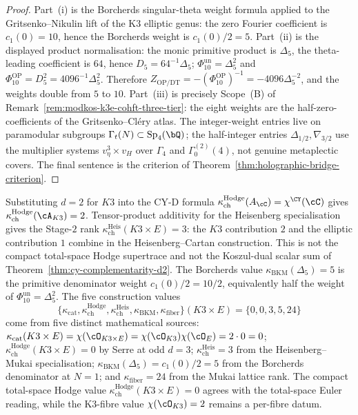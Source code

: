 \begin{proof}
Part~(i) is the Borcherds singular-theta weight formula applied to the
Gritsenko--Nikulin lift of the K3 elliptic genus: the zero Fourier
coefficient is \(c_1(0)=10\), hence the Borcherds weight is
\(c_1(0)/2=5\). Part~(ii) is the displayed product normalisation:
the monic primitive product is \(\Delta_5\), the theta-leading
coefficient is \(64\), hence \(D_5=64^{-1}\Delta_5\);
\(\Phi_{10}^{\mathrm{un}}=\Delta_5^2\) and
\(\Phi_{10}^{\mathrm{OP}}=D_5^2=4096^{-1}\Delta_5^2\). Therefore
\(Z_{\mathrm{OP}/\mathrm{DT}}=-(\Phi_{10}^{\mathrm{OP}})^{-1}
=-4096\Delta_5^{-2}\), and the weights double from \(5\) to \(10\).
Part~(iii) is precisely Scope~(B) of
Remark~\ref{rem:modkos-k3e-cohft-three-tier}: the eight weights are
the half-zero-coefficients of the Gritsenko--Cl\'ery atlas. The
integer-weight entries live on paramodular subgroups
$\Gamma_t(N) \subset \mathrm{Sp}_4(\bQ)$; the half-integer entries
$\Delta_{1/2}, \nabla_{3/2}$ use the multiplier systems
$v_\eta^3 \times v_H$ over $\Gamma_4$ and $\Gamma_0^{(2)}(4)$, not
genuine metaplectic covers.
The final sentence is the criterion of
Theorem~\ref{thm:holographic-bridge-criterion}.
\end{proof}

\begin{remark}
\label{rem:kappa-spectrum-k3xe-bridge}
Substituting $d = 2$ for $K3$ into the CY-D formula $\kappa_{\mathrm{ch}}^{\mathrm{Hodge}}(A_\cC) = \chi^{\CY}(\cC)$ gives $\kappa_{\mathrm{ch}}^{\mathrm{Hodge}}(\cA_{K3}) = 2$. Tensor-product additivity for the Heisenberg specialisation gives the Stage-$2$ rank $\kappa_{\mathrm{ch}}^{\mathrm{Heis}}(K3 \times E) = 3$: the $K3$ contribution $2$ and the elliptic contribution $1$ combine in the Heisenberg--Cartan construction. This is not the compact total-space Hodge supertrace and not the Koszul-dual scalar sum of Theorem~\ref{thm:cy-complementarity-d2}. The Borcherds value $\kappa_{\mathrm{BKM}}(\Delta_5) = 5$ is the primitive denominator weight $c_1(0)/2=10/2$, equivalently half the weight of $\Phi_{10}^{\mathrm{un}}=\Delta_5^2$. The five construction values
\[
\{\kappa_{\mathrm{cat}}, \kappa_{\mathrm{ch}}^{\mathrm{Hodge}},
\kappa_{\mathrm{ch}}^{\mathrm{Heis}},
\kappa_{\mathrm{BKM}}, \kappa_{\mathrm{fiber}}\}(K3\times E)
=\{0, 0, 3, 5, 24\}
\]
come from five distinct mathematical sources: $\kappa_{\mathrm{cat}}(K3 \times E) = \chi(\cO_{K3 \times E}) = \chi(\cO_{K3}) \chi(\cO_E) = 2 \cdot 0 = 0$; $\kappa_{\mathrm{ch}}^{\mathrm{Hodge}}(K3 \times E) = 0$ by Serre at odd $d = 3$; $\kappa_{\mathrm{ch}}^{\mathrm{Heis}}=3$ from the Heisenberg--Mukai specialisation; $\kappa_{\mathrm{BKM}}(\Delta_5) = c_1(0)/2 = 5$ from the Borcherds denominator at $N = 1$; and $\kappa_{\mathrm{fiber}}=24$ from the Mukai lattice rank. The compact total-space Hodge value $\kappa_{\mathrm{ch}}^{\mathrm{Hodge}}(K3\times E)=0$ agrees with the total-space Euler reading, while the K3-fibre value $\chi(\cO_{K3}) = 2$ remains a per-fibre datum.
\end{remark}

